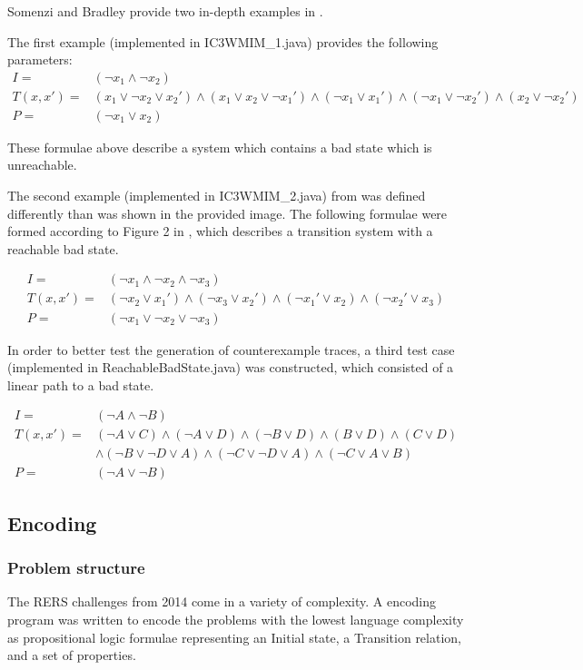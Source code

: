 \documentclass[a4paper]{article}
\begin{document}
Somenzi and Bradley provide two in-depth examples in \cite{Somenzi2011}.

The first example (implemented in IC3WMIM\_1.java) provides the following parameters:
\begin{align*}
I =& (\lnot x_1 \land \lnot x_2)\\
T(x,x') =& (x_1 \lor \lnot x_2 \lor x_2') \land (x_1 \lor x_2 \lor \lnot x_1') \land (\lnot x_1 \lor x_1') \land (\lnot x_1 \lor \lnot x_2') \land (x_2 \lor \lnot x_2') \\
P =& (\lnot x_1 \lor x_2)
\end{align*}

These formulae above describe a system which contains a bad state which is unreachable.

The second example (implemented in IC3WMIM\_2.java) from \cite{Somenzi2011} was defined differently than was shown in the provided image.
The following formulae were formed according to Figure 2 in \cite{Somenzi2011}, which describes a transition system with a reachable bad state.

\begin{align*}
I =& (\lnot x_1 \land \lnot x_2 \land \lnot x_3)\\
T(x,x') =& (\lnot x_2 \lor x_1') \land (\lnot x_3 \lor x_2') \land (\lnot x_1' \lor x_2) \land (\lnot x_2' \lor x_3)\\
P =& (\lnot x_1 \lor \lnot x_2 \lor \lnot x_3)
\end{align*}

In order to better test the generation of counterexample traces, a third test case (implemented in ReachableBadState.java) was constructed, which consisted of a linear path to a bad state.

\begin{align*}
I =& (\lnot A \land \lnot B)\\
T(x,x') =& (\lnot A \lor C) \land (\lnot A \lor D) \land (\lnot B \lor D) \land (B \lor D) \land (C \lor D)\\
&\land (\lnot B \lor \lnot D \lor A) \land (\lnot C \lor \lnot D \lor A) \land (\lnot C \lor A \lor B)\\
P =& (\lnot A \lor \lnot B)
\end{align*}

\subsection{Encoding} %
\subsubsection{Problem structure}
The RERS challenges from 2014 come in a variety of complexity. A encoding program was written to encode the problems with the lowest language complexity as propositional logic formulae representing an Initial state, a Transition relation, and a set of properties.
\end{document}
